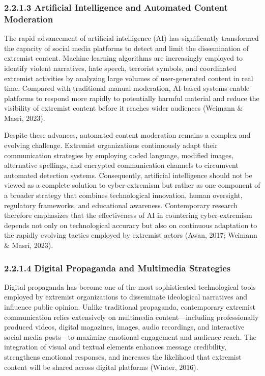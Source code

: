 \documentclass[10pt]{NSP1}
\begin{document}
	\subsubsection*{2.2.1.3 Artificial Intelligence and Automated Content Moderation}
	
	The rapid advancement of artificial intelligence (AI) has significantly transformed the capacity of social media platforms to detect and limit the dissemination of extremist content. Machine learning algorithms are increasingly employed to identify violent narratives, hate speech, terrorist symbols, and coordinated extremist activities by analyzing large volumes of user-generated content in real time. Compared with traditional manual moderation, AI-based systems enable platforms to respond more rapidly to potentially harmful material and reduce the visibility of extremist content before it reaches wider audiences (Weimann \& Masri, 2023).
	
	Despite these advances, automated content moderation remains a complex and evolving challenge. Extremist organizations continuously adapt their communication strategies by employing coded language, modified images, alternative spellings, and encrypted communication channels to circumvent automated detection systems. Consequently, artificial intelligence should not be viewed as a complete solution to cyber-extremism but rather as one component of a broader strategy that combines technological innovation, human oversight, regulatory frameworks, and educational awareness. Contemporary research therefore emphasizes that the effectiveness of AI in countering cyber-extremism depends not only on technological accuracy but also on continuous adaptation to the rapidly evolving tactics employed by extremist actors (Awan, 2017; Weimann \& Masri, 2023).
	
	\subsubsection*{2.2.1.4 Digital Propaganda and Multimedia Strategies}
	
	Digital propaganda has become one of the most sophisticated technological tools employed by extremist organizations to disseminate ideological narratives and influence public opinion. Unlike traditional propaganda, contemporary extremist communication relies extensively on multimedia content—including professionally produced videos, digital magazines, images, audio recordings, and interactive social media posts—to maximize emotional engagement and audience reach. The integration of visual and textual elements enhances message credibility, strengthens emotional responses, and increases the likelihood that extremist content will be shared across digital platforms (Winter, 2016).
	
\end{document}
